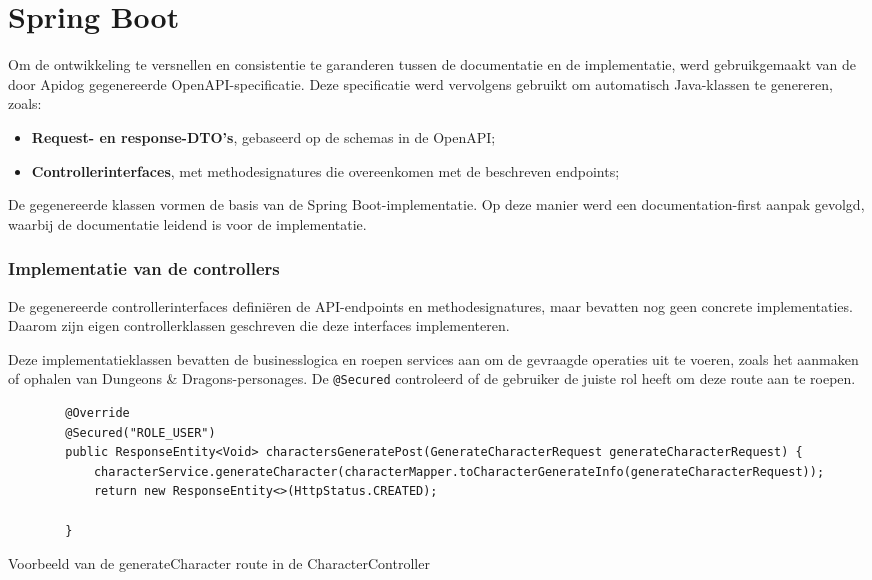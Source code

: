 \chapter{Spring Boot}
\label{ch:springboot}

Om de ontwikkeling te versnellen en consistentie te garanderen tussen de documentatie en de implementatie, werd gebruikgemaakt van de door Apidog gegenereerde OpenAPI-specificatie. Deze specificatie werd vervolgens gebruikt om automatisch Java-klassen te genereren, zoals:
\begin{itemize}
    \item \textbf{Request- en response-DTO's}, gebaseerd op de schemas in de OpenAPI;
    \item \textbf{Controllerinterfaces}, met methodesignatures die overeenkomen met de beschreven endpoints;
\end{itemize}

De gegenereerde klassen vormen de basis van de Spring Boot-implementatie. Op deze manier werd een documentation-first aanpak gevolgd, waarbij de documentatie leidend is voor de implementatie.

\subsection{Implementatie van de controllers}

De gegenereerde controllerinterfaces definiëren de API-endpoints en methodesignatures, maar bevatten nog geen concrete implementaties. Daarom zijn eigen controllerklassen geschreven die deze interfaces implementeren. 

Deze implementatieklassen bevatten de businesslogica en roepen services aan om de gevraagde operaties uit te voeren, zoals het aanmaken of ophalen van Dungeons \& Dragons-personages. De \texttt{@Secured} controleerd of de gebruiker de juiste rol heeft om deze route aan te roepen.

\begin{listing}
    \begin{verbatim}
        @Override
        @Secured("ROLE_USER")
        public ResponseEntity<Void> charactersGeneratePost(GenerateCharacterRequest generateCharacterRequest) {
            characterService.generateCharacter(characterMapper.toCharacterGenerateInfo(generateCharacterRequest));
            return new ResponseEntity<>(HttpStatus.CREATED);
            
        }
    \end{verbatim}
    \caption[controllerExample]{Voorbeeld van de generateCharacter route in de CharacterController}
\end{listing}

